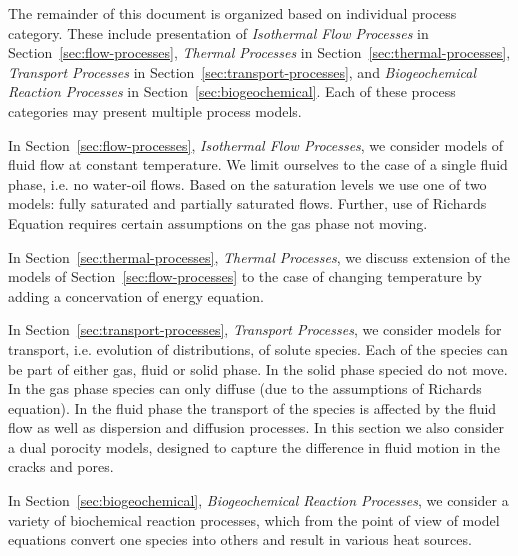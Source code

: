 The remainder of this document is organized based on individual process category.
These include presentation of
\emph{Isothermal Flow Processes} in Section~\ref{sec:flow-processes}, 
\emph{Thermal Processes} in Section~\ref{sec:thermal-processes},
\emph{Transport Processes} in Section~\ref{sec:transport-processes}, and 
\emph{Biogeochemical Reaction Processes} in Section~\ref{sec:biogeochemical}. 
%
Each of these process categories may present multiple process models.  


In Section~\ref{sec:flow-processes}, \emph{Isothermal Flow Processes}, 
we consider models of fluid flow at constant temperature.
We limit ourselves to the case of a single fluid phase, i.e. no water-oil flows.
Based on the saturation levels we use one of two models:
fully saturated and partially saturated flows.
Further, use of Richards Equation requires certain assumptions on the gas phase not moving.

In Section~\ref{sec:thermal-processes}, \emph{Thermal Processes},
we discuss extension of the models of Section~\ref{sec:flow-processes}
to the case of changing temperature by adding a concervation of energy equation.


In Section~\ref{sec:transport-processes}, \emph{Transport Processes},
we consider models for transport, i.e. evolution of distributions, of solute species. 
Each of the species can be part of either gas, fluid or solid phase.
In the solid phase specied do not move.
In the gas phase species can only diffuse (due to the assumptions of Richards equation).
In the fluid phase the transport of the species is affected by the 
fluid flow as well as dispersion and diffusion processes. 
In this section we also consider a dual porocity models,
designed to capture the difference in fluid motion in the cracks and pores.  
 

In Section~\ref{sec:biogeochemical}, \emph{Biogeochemical Reaction Processes},
we consider a variety of biochemical reaction processes,
which from the point of view of model equations
convert one species into others and result in various heat sources.
  

